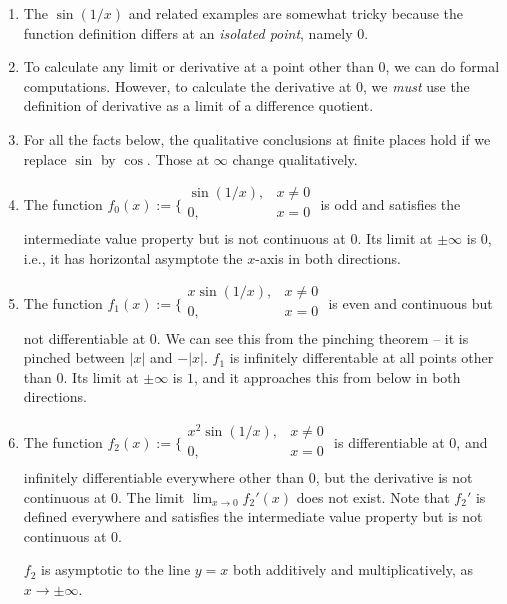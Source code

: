 \documentclass[10pt]{amsart}
\begin{document}
\begin{enumerate}
\item The $\sin(1/x)$ and related examples are somewhat tricky because
  the function definition differs at an {\em isolated point}, namely $0$.
\item To calculate any limit or derivative at a point other than $0$,
  we can do formal computations. However, to calculate the derivative
  at $0$, we {\em must} use the definition of derivative as a limit of
  a difference quotient.
\item For all the facts below, the qualitative conclusions at finite
  places hold if we replace $\sin$ by $\cos$. Those at $\infty$ change
  qualitatively.
\item The function $f_0(x) := \lbrace \begin{array}{rl} \sin(1/x), & x
  \ne 0 \\ 0, & x = 0 \\\end{array}$ is odd and satisfies the intermediate
  value property but is not continuous at $0$. Its limit at $\pm
  \infty$ is $0$, i.e., it has horizontal asymptote the $x$-axis in
  both directions.
\item The function $f_1(x) := \lbrace \begin{array}{rl} x\sin(1/x), &
  x \ne 0 \\ 0, & x = 0 \\\end{array}$ is even and continuous but not
  differentiable at $0$. We can see this from the pinching theorem --
  it is pinched between $|x|$ and $-|x|$. $f_1$ is infinitely
  differentable at all points other than $0$. Its limit at $\pm
  \infty$ is $1$, and it approaches this from below in both
  directions.
\item The function $f_2(x) := \lbrace \begin{array}{rl} x^2\sin(1/x), &
  x \ne 0 \\ 0, & x = 0 \\\end{array}$ is differentiable at $0$, and
  infinitely differentiable everywhere other than $0$, but the
  derivative is not continuous at $0$. The limit $\lim_{x \to 0}
  f_2'(x)$ does not exist. Note that $f_2'$ is defined everywhere and
  satisfies the intermediate value property but is not continuous at $0$.

  $f_2$ is asymptotic to the line $y = x$ both additively and
  multiplicatively, as $x \to \pm \infty$.


\end{enumerate}
\end{document}
